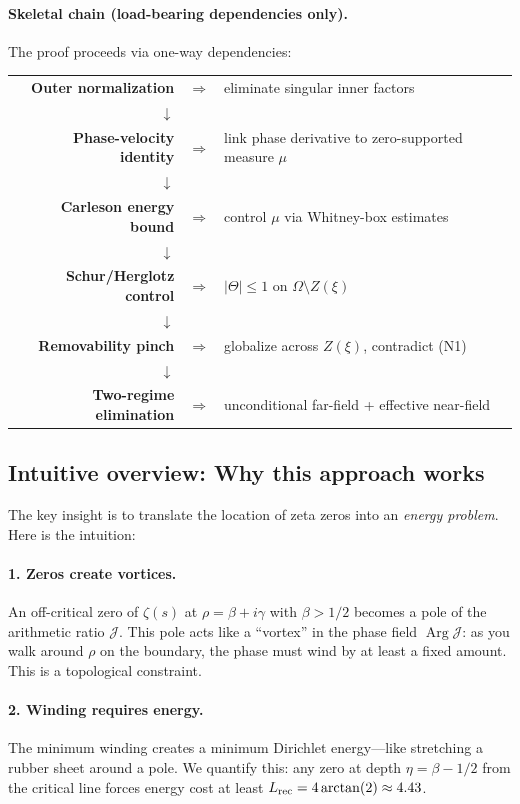 \documentclass[11pt]{article}
\theoremstyle{definition}
\theoremstyle{remark}
\theoremstyle{definition}
\DeclareMathOperator{\Arg}{Arg}
\begin{document}
\paragraph{Skeletal chain (load-bearing dependencies only).}
The proof proceeds via one-way dependencies:
\begin{center}
\begin{tabular}{rcl}
\textbf{Outer normalization} & $\Rightarrow$ & eliminate singular inner factors \\
$\downarrow$ & & \\
\textbf{Phase-velocity identity} & $\Rightarrow$ & link phase derivative to zero-supported measure $\mu$ \\
$\downarrow$ & & \\
\textbf{Carleson energy bound} & $\Rightarrow$ & control $\mu$ via Whitney-box estimates \\
$\downarrow$ & & \\
\textbf{Schur/Herglotz control} & $\Rightarrow$ & $|\Theta| \le 1$ on $\Omega \setminus Z(\xi)$ \\
$\downarrow$ & & \\
\textbf{Removability pinch} & $\Rightarrow$ & globalize across $Z(\xi)$, contradict (N1) \\
$\downarrow$ & & \\
\textbf{Two-regime elimination} & $\Rightarrow$ & unconditional far-field + effective near-field
\end{tabular}
\end{center}

\subsection*{Intuitive overview: Why this approach works}

The key insight is to translate the location of zeta zeros into an \emph{energy problem}. Here is the intuition:

\paragraph{1. Zeros create vortices.} An off-critical zero of $\zeta(s)$ at $\rho = \beta + i\gamma$ with $\beta > 1/2$ becomes a pole of the arithmetic ratio $\mathcal{J}$. This pole acts like a ``vortex'' in the phase field $\Arg \mathcal{J}$: as you walk around $\rho$ on the boundary, the phase must wind by at least a fixed amount. This is a topological constraint.

\paragraph{2. Winding requires energy.} The minimum winding creates a minimum Dirichlet energy---like stretching a rubber sheet around a pole. We quantify this: any zero at depth $\eta = \beta - 1/2$ from the critical line forces energy cost at least $L_{\rm rec} = 4\arctan(2) \approx 4.43$.
\end{document}
